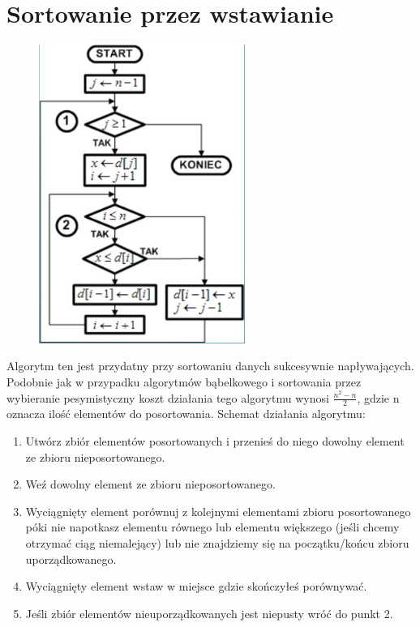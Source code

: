 \documentclass[a4paper,11pt]{article}
\begin{document}
\section{Sortowanie przez wstawianie}
\begin{figure}
\begin{center}
\vspace{-20pt}
\includegraphics[width=0.6\textwidth]{rys14}
\end{center}
\vspace{-20pt}
\vspace{-10pt}
\end{figure}
Algorytm ten jest przydatny przy sortowaniu danych 
sukcesywnie napływających. Podobnie jak w przypadku 
algorytmów bąbelkowego i sortowania przez 
wybieranie pesymistyczny koszt działania tego 
algorytmu wynosi \begin{math}
\frac{n^{2}-n}{2}
\end{math}, gdzie n oznacza ilość 
elementów do posortowania. 
Schemat działania algorytmu: 
\begin{enumerate}
\item Utwórz zbiór elementów posortowanych i przenieś 
do niego dowolny element ze zbioru 
nieposortowanego. 
\item Weź dowolny element ze zbioru nieposortowanego. 
\item Wyciągnięty element porównuj z kolejnymi 
elementami zbioru posortowanego póki nie 
napotkasz elementu równego lub elementu 
większego (jeśli chcemy otrzymać ciąg niemalejący) 
lub nie znajdziemy się na początku/końcu zbioru 
uporządkowanego. 
\item Wyciągnięty element wstaw w miejsce gdzie 
skończyłeś porównywać. 
\item Jeśli zbiór elementów nieuporządkowanych jest 
niepusty wróć do punkt 2. 
\end{enumerate}
\end{document}
